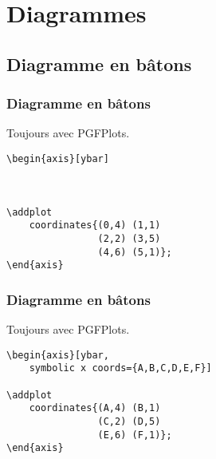 \documentclass{clic_latex_beamer}
\begin{document}
\section{Diagrammes}
\subsection{Diagramme en bâtons}
\begin{frame}[fragile]
\frametitle{Diagramme en bâtons}
Toujours avec PGFPlots.
\begin{multicols}{2}


\columnbreak

\begin{lstlisting}
\begin{axis}[ybar]



\addplot
    coordinates{(0,4) (1,1)
                (2,2) (3,5)
                (4,6) (5,1)};
\end{axis}
\end{lstlisting}

\end{multicols}

\end{frame}


\begin{frame}[fragile]
\frametitle{Diagramme en bâtons}
Toujours avec PGFPlots.
\begin{multicols}{2}


\columnbreak

\begin{lstlisting}
\begin{axis}[ybar,
    symbolic x coords={A,B,C,D,E,F}]
    
\addplot
    coordinates{(A,4) (B,1)
                (C,2) (D,5)
                (E,6) (F,1)};
\end{axis}
\end{lstlisting}

\end{multicols}

\end{frame}
\end{document}
